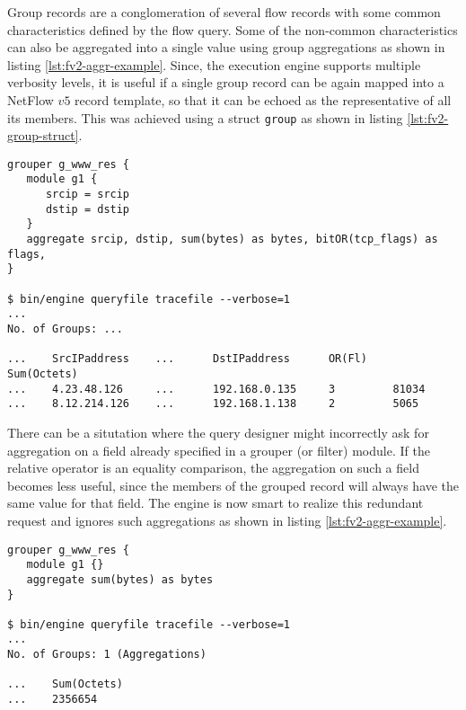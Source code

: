 Group records are a conglomeration of several flow records with some common
characteristics defined by the flow query. Some of the non-common
characteristics can also be aggregated into a single value using group
 aggregations as shown in listing
\ref{lst:fv2-aggr-example}. Since, the execution engine supports multiple
verbosity levels, it is useful if a single group record can be again mapped
into a NetFlow $v5$ record template, so that it can be echoed as the
representative of all its members. This was achieved using a struct
\texttt{group} as shown in listing \ref{lst:fv2-group-struct}.

\begin{lstlisting}
grouper g_www_res {
   module g1 {
      srcip = srcip
      dstip = dstip
   }
   aggregate srcip, dstip, sum(bytes) as bytes, bitOR(tcp_flags) as flags,
}

$ bin/engine queryfile tracefile --verbose=1
...
No. of Groups: ...

...    SrcIPaddress    ...      DstIPaddress      OR(Fl)    Sum(Octets)
...    4.23.48.126     ...      192.168.0.135     3         81034
...    8.12.214.126    ...      192.168.1.138     2         5065
\end{lstlisting}

There can be a situtation where the query designer might incorrectly ask
for aggregation on a field already specified in a grouper (or filter)
module. If  the
relative operator is an equality comparison, the aggregation on such a
field becomes less useful, since the members of the grouped record will
always have the same value for that field. The engine is now smart to
realize this redundant request and ignores such aggregations as shown in
listing \ref{lst:fv2-aggr-example}.

\begin{lstlisting}
grouper g_www_res {
   module g1 {}
   aggregate sum(bytes) as bytes
}

$ bin/engine queryfile tracefile --verbose=1
...
No. of Groups: 1 (Aggregations)

...    Sum(Octets)
...    2356654
\end{lstlisting}

